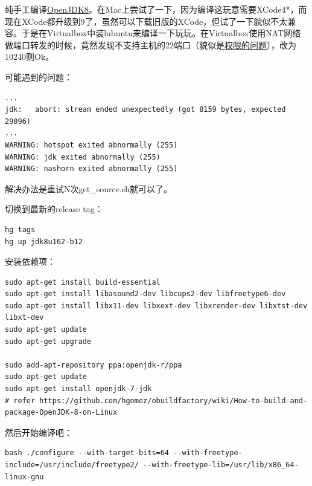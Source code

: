 \documentclass[12pt]{article}
\begin{document}
\makeblogtitle

纯手工编译\href{http://openjdk.java.net/projects/jdk8u/}{OpenJDK8}。在Mac上尝试了一下，因为编译这玩意需要XCode4*，而现在XCode都升级到9了，虽然可以下载旧版的XCode，但试了一下貌似不太兼容。于是在Virtualbox中装lubuntu来编译一下玩玩。在Virtualbox使用NAT网络做端口转发的时候，竟然发现不支持主机的22端口（貌似是\href{https://apple.stackexchange.com/questions/235518/ssh-to-virtualbox-mac-host-linux-guest-using-nat}{权限的问题}），改为10240则Ok。

\begin{Shaded}
\begin{Highlighting}[]
\end{Highlighting}
\end{Shaded}

可能遇到的问题：

\begin{verbatim}
...
jdk:   abort: stream ended unexpectedly (got 8159 bytes, expected 29096)
...
WARNING: hotspot exited abnormally (255)
WARNING: jdk exited abnormally (255)
WARNING: nashorn exited abnormally (255)
\end{verbatim}

解决办法是重试N次get\_source.sh就可以了。

切换到最新的release tag：

\begin{verbatim}
hg tags
hg up jdk8u162-b12
\end{verbatim}

安装依赖项：

\begin{verbatim}
sudo apt-get install build-essential
sudo apt-get install libasound2-dev libcups2-dev libfreetype6-dev
sudo apt-get install libx11-dev libxext-dev libxrender-dev libxtst-dev libxt-dev
sudo apt-get update
sudo apt-get upgrade

sudo add-apt-repository ppa:openjdk-r/ppa  
sudo apt-get update   
sudo apt-get install openjdk-7-jdk  
# refer https://github.com/hgomez/obuildfactory/wiki/How-to-build-and-package-OpenJDK-8-on-Linux
\end{verbatim}

然后开始编译吧：

\begin{verbatim}
bash ./configure --with-target-bits=64 --with-freetype-include=/usr/include/freetype2/ --with-freetype-lib=/usr/lib/x86_64-linux-gnu
\end{verbatim}
\end{document}
